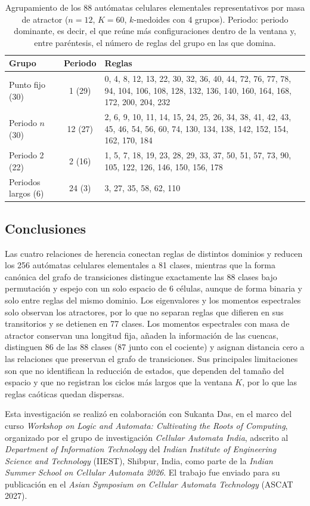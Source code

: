 \begin{table}[htbp]
	\centering
	\caption{Agrupamiento de los 88 autómatas celulares elementales representativos por masa de atractor ($n = 12$, $K = 60$, $k$-medoides con 4 grupos). Periodo: periodo dominante, es decir, el que reúne más configuraciones dentro de la ventana y, entre paréntesis, el número de reglas del grupo en las que domina.}
	\label{tab:clusters}
	\begin{tabular}{l c p{}}
		\hline
		Grupo & Periodo & Reglas \\
		\hline
		Punto fijo (30)     & 1 (29)  & 0, 4, 8, 12, 13, 22, 30, 32, 36, 40, 44, 72, 76, 77, 78, 94, 104, 106, 108, 128, 132, 136, 140, 160, 164, 168, 172, 200, 204, 232 \\
		Periodo $n$ (30)    & 12 (27) & 2, 6, 9, 10, 11, 14, 15, 24, 25, 26, 34, 38, 41, 42, 43, 45, 46, 54, 56, 60, 74, 130, 134, 138, 142, 152, 154, 162, 170, 184 \\
		Periodo 2 (22)      & 2 (16)  & 1, 5, 7, 18, 19, 23, 28, 29, 33, 37, 50, 51, 57, 73, 90, 105, 122, 126, 146, 150, 156, 178 \\
		Periodos largos (6) & 24 (3)  & 3, 27, 35, 58, 62, 110 \\
		\hline
	\end{tabular}
\end{table}


\subsection{Conclusiones}

Las cuatro relaciones de herencia conectan reglas de distintos dominios y reducen los 256 autómatas celulares elementales a 81 clases, mientras que la forma canónica del grafo de transiciones distingue exactamente las 88 clases bajo permutación y espejo con un solo espacio de 6 células, aunque de forma binaria y solo entre reglas del mismo dominio. Los eigenvalores y los momentos espectrales solo observan los atractores, por lo que no separan reglas que difieren en sus transitorios y se detienen en 77 clases. Los momentos espectrales con masa de atractor conservan una longitud fija, añaden la información de las cuencas, distinguen 86 de las 88 clases (87 junto con el cociente) y asignan distancia cero a las relaciones que preservan el grafo de transiciones. Sus principales limitaciones son que no identifican la reducción de estados, que dependen del tamaño del espacio y que no registran los ciclos más largos que la ventana $K$, por lo que las reglas caóticas quedan dispersas.

Esta investigación se realizó en colaboración con Sukanta Das, en el marco del curso \textit{Workshop on Logic and Automata: Cultivating the Roots of Computing}, organizado por el grupo de investigación \textit{Cellular Automata India}, adscrito al \textit{Department of Information Technology} del \textit{Indian Institute of Engineering Science and Technology} (IIEST), Shibpur, India, como parte de la \textit{Indian Summer School on Cellular Automata 2026}. El trabajo fue enviado para su publicación en el \textit{Asian Symposium on Cellular Automata Technology} (ASCAT 2027).
